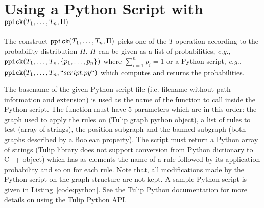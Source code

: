 \documentclass[a4paper,10pt,runningheads]{llncs}
\newcommand{\TULIP}{{\sc Tulip}\xspace}
\newcommand{\ppick}[1]{{\tt ppick(}#1{\tt )}}
\begin{document}
% 

\section*{Using a Python Script with $\ppick{T_1, \dots, T_n, \Pi}$}
\label{sect:python}

The construct $\ppick{T_1, \dots, T_n, \Pi}$ %
picks one of the $T$ 
operation according to the probability distribution $\Pi$.
$\Pi$ can be given as a list of probabilities, \emph{e.g.}, $\ppick{T_1, \dots, T_n, \{p_1, \dots, p_n\}}$ where 
$\sum_{i=1}^n p_i=1$ or a Python script, \emph{e.g.}, $\ppick{T_1, \dots, T_n, ``script.py``}$ which computes and returns the probabilities.

The basename of the given Python script file (i.e. filename without path information and extension) 
is used as the name of the function to call inside the Python script. The function must have 5 
parameters which are 
in this order: the graph used to apply the rules on (\TULIP graph python object), a list of rules to test (array of strings),
the position subgraph and the banned subgraph (both graphs described by a Boolean property).
The script must return a Python array of strings (\TULIP library does not 
support 
conversion from Python dictionary to C++ object) which has as 
elements the name of a rule followed by its application probability and so on for each rule.  
Note that, all modifications made by the Python script on the graph structure 
are not kept.
A sample Python script is given in Listing~\ref{code:python}. See the \TULIP Python 
documentation for more details on using the \TULIP Python API.
\end{document}
